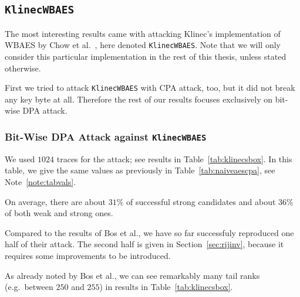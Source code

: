 \subsection{\tt KlinecWBAES}
\label{sec:klinecwbaes}

The most interesting results came with attacking Klinec's implementation \cite{klinec2013implementation} of WBAES by Chow et al.\ \cite{chow2002aes}, here denoted {\tt KlinecWBAES}. Note that we will only consider this particular implementation in the rest of this thesis, unless stated otherwise.

First we tried to attack {\tt KlinecWBAES} with CPA attack, too, but it did not break any key byte at all. Therefore the rest of our results focuses exclusively on bit-wise DPA attack.

\subsubsection{Bit-Wise DPA Attack against {\tt KlinecWBAES}}
	
	We used $1024$ traces for the attack; see results in Table~\ref{tab:klinecsbox}. In this table, we give the same values as previously in Table~\ref{tab:naiveaescpa}, see Note~\ref{note:tabvals}.
	
	
	On average, there are about $31\%$ of successful strong candidates and about $36\%$ of both weak and strong ones.
	
	Compared to the results of Bos et al., we have so far successfuly reproduced one half of their attack. The second half is given in Section~\ref{sec:rijinv}, because it requires some improvements to be introduced.
	
	\begin{note}
	\label{note:tailrank}
		As already noted by Bos et al., we can see remarkably many tail ranks (e.g.\ between $250$ and $255$) in results in Table~\ref{tab:klinecsbox}.
	\end{note}



